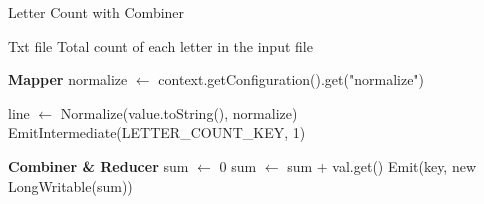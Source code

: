 \begin{algorithm}[H]
    \caption{Letter Count with Combiner}
    \begin{algorithmic}[1]
        \Require Txt file
        \Ensure Total count of each letter in the input file
        
        \vspace{1em}
        \Statex
        \noindent \textbf{Mapper}
        \State normalize $\leftarrow$ context.getConfiguration().get("normalize")
        \EndProcedure

        \State line $\leftarrow$ Normalize(value.toString(), normalize) 
        \State EmitIntermediate(LETTER\_COUNT\_KEY, 1)
        \EndFor
        \EndProcedure

        \vspace{1em}

        \Statex
        \noindent \textbf{Combiner \& Reducer}
        \State sum $\leftarrow$ 0
        \State sum $\leftarrow$ sum + val.get()
        \EndFor
        \State Emit(key, new LongWritable(sum))
        \EndProcedure
    \end{algorithmic}
\end{algorithm}



